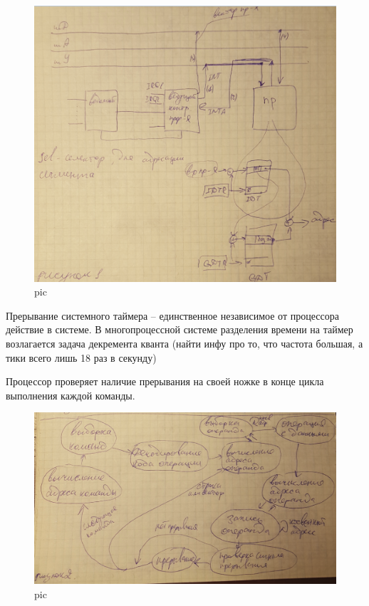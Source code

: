 \begin{figure}[H]
    \centering
    \includegraphics[width=\textwidth]{pic/3.png}
    \caption{pic}
\end{figure}

Прерывание системного таймера – единственное независимое от процессора действие в системе. В многопроцессной системе разделения времени на таймер возлагается задача декремента кванта (найти инфу про то, что частота большая, а тики всего лишь 18 раз в секунду)

Процессор проверяет наличие прерывания на своей ножке  в конце цикла выполнения каждой команды.

\begin{figure}[H]
    \centering
    \includegraphics[width=\textwidth]{pic/4.png}
    \caption{pic}
\end{figure}

